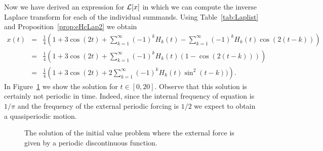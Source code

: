 \documentclass{ximera}
\begin{document}
Now we have derived an expression for ${\cal L}[x]$ in which we can compute the
inverse Laplace transform for each of the individual summands.  Using 
Table~\ref{tab:Laplist} and Proposition~\ref{prop:eHcLap2} we obtain
\begin{eqnarray*}
x(t)&=&\frac{1}{4}\left(1+3\cos(2t)+\sum_{k=1}^\infty (-1)^k H_k(t)
       -\sum_{k=1}^\infty (-1)^k H_k(t)\cos(2(t-k))\right)\\
&=&\frac{1}{4}\left(1+3\cos(2t)+\sum_{k=1}^\infty (-1)^k H_k(t)(1-\cos(2(t-k)))\right)\\
&=&\frac{1}{4}\left(1+3\cos(2t)+2\sum_{k=1}^\infty (-1)^k H_k(t)\sin^2(t-k))\right).
\end{eqnarray*}
In Figure~\ref{fig:lapperi} we show the solution for $t\in [0,20]$.  Observe 
that this solution is certainly not periodic in time.  Indeed, since the 
internal frequency of equation  is 
$1/\pi$ and the frequency of the external periodic forcing is $1/2$ we expect 
to obtain a quasiperiodic motion.
\begin{figure}[htb]
           \centerline{%
           }
           \caption{The solution of the initial value problem
	   \protect{} where the external force is
   	   given by a periodic discontinuous function.}
           \label{fig:lapperi}
\end{figure}
\end{document}
